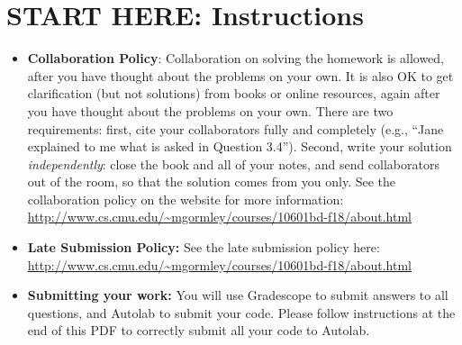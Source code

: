 \documentclass[11pt]{article}
\numberwithin{equation}{section} %
\numberwithin{figure}{section} %
\numberwithin{table}{section} %
\begin{document}
\section*{START HERE: Instructions}
\begin{itemize}

\item \textbf{Collaboration Policy}: Collaboration on solving the homework is allowed, after you have thought about the problems on your own. It is also OK to get clarification (but not solutions) from books or online resources, again after you have thought about the problems on your own. There are two requirements: first, cite your collaborators fully and completely (e.g., ``Jane explained to me what is asked in Question 3.4''). Second, write your solution {\em independently}: close the book and all of your notes, and send collaborators out of the room, so that the solution comes from you only.  See the collaboration policy on the website for more information: \url{http://www.cs.cmu.edu/~mgormley/courses/10601bd-f18/about.html}
\item\textbf{Late Submission Policy:} See the late submission policy
  here:
  \url{http://www.cs.cmu.edu/~mgormley/courses/10601bd-f18/about.html}

\item\textbf{Submitting your work:} You will use Gradescope to submit
  answers to all questions, and Autolab to submit your code. Please
  follow instructions at the end of this PDF to correctly submit all your code to Autolab.

  \begin{itemize}
    

    

\end{itemize}
\end{itemize}
\end{document}
